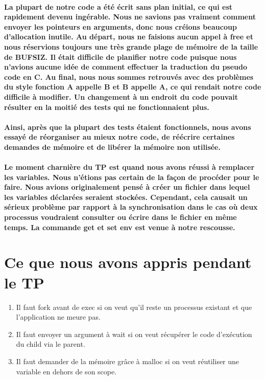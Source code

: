 \documentclass{article}
\begin{document}
\paragraph{La plupart de notre code a été écrit sans plan initial, ce qui est rapidement devenu ingérable. Nous ne savions pas vraiment comment envoyer les pointeurs en arguments, donc nous créions beaucoup d’allocation inutile. Au départ, nous ne faisions aucun appel à free et nous réservions toujours une très grande plage de mémoire de la taille de BUFSIZ. Il était difficile de planifier notre code puisque nous n’avions aucune idée de comment effectuer la traduction du pseudo code en C. Au final, nous nous sommes retrouvés avec des problèmes du style fonction A appelle B et B appelle A, ce qui rendait notre code difficile à modifier. Un changement à un endroit du code pouvait résulter en la moitié des tests qui ne fonctionnaient plus.}


\paragraph{Ainsi, après que la plupart des tests étaient fonctionnels, nous avons essayé de réorganiser au mieux notre code, de réécrire certaines demandes de mémoire et de libérer la mémoire non utilisée. }

\paragraph{Le moment charnière du TP est quand nous avons réussi à remplacer les variables. Nous n’étions pas certain de la façon de procéder pour le faire. Nous avions originalement pensé à créer un fichier dans lequel les variables déclarées seraient stockées. Cependant, cela causait un sérieux problème par rapport à la synchronisation dans le cas où deux processus voudraient consulter ou écrire dans le fichier en même temps. La commande get et set env est venue à notre rescousse. }

\section{Ce que nous avons appris pendant le TP}
\begin{enumerate}
\item Il faut fork avant de exec si on veut qu’il reste un processus existant et que l’application ne meure pas.
\item Il faut envoyer un argument à wait si on veut récupérer le code d’exécution du child via le parent.
\item Il faut demander de la mémoire grâce à malloc si on veut réutiliser une variable en dehors de son scope.
\end{enumerate}
\end{document}
